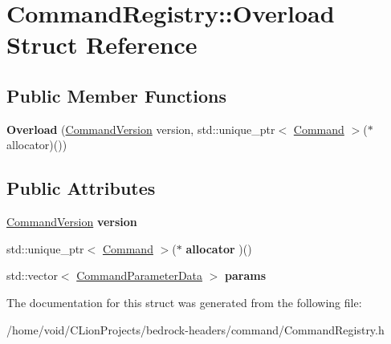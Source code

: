 \hypertarget{struct_command_registry_1_1_overload}{}\section{Command\+Registry\+::Overload Struct Reference}
\label{struct_command_registry_1_1_overload}
\subsection*{Public Member Functions}
\begin{DoxyCompactItemize}
\item 
\mbox{\label{struct_command_registry_1_1_overload_a06cdc8b3c8671a252cfc32d0a4ff8c6d}} 
{\bfseries Overload} (\mbox{\hyperlink{struct_command_version}{Command\+Version}} version, std\+::unique\+\_\+ptr$<$ \mbox{\hyperlink{struct_command}{Command}} $>$($\ast$allocator)())
\end{DoxyCompactItemize}
\subsection*{Public Attributes}
\begin{DoxyCompactItemize}
\item 
\mbox{\label{struct_command_registry_1_1_overload_ab2aba49dc3e2a5aa8176c16a2be5ab87}} 
\mbox{\hyperlink{struct_command_version}{Command\+Version}} {\bfseries version}
\item 
\mbox{\label{struct_command_registry_1_1_overload_a8baa313a3ddd6b336cd3a4a456cd9a8c}} 
std\+::unique\+\_\+ptr$<$ \mbox{\hyperlink{struct_command}{Command}} $>$($\ast$ {\bfseries allocator} )()
\item 
\mbox{\label{struct_command_registry_1_1_overload_a663848d1735c5028fe2f3835ea166f8f}} 
std\+::vector$<$ \mbox{\hyperlink{struct_command_parameter_data}{Command\+Parameter\+Data}} $>$ {\bfseries params}
\end{DoxyCompactItemize}


The documentation for this struct was generated from the following file\+:\begin{DoxyCompactItemize}
\item 
/home/void/\+C\+Lion\+Projects/bedrock-\/headers/command/Command\+Registry.\+h\end{DoxyCompactItemize}
